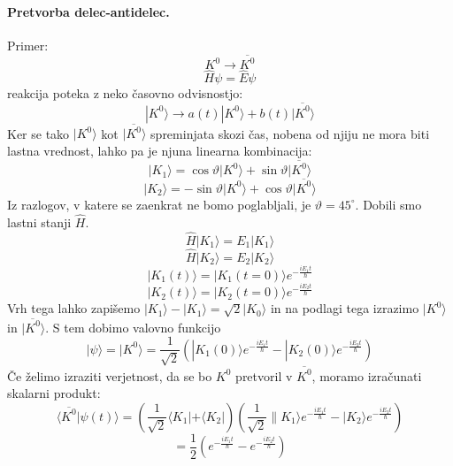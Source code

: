 \documentclass[a4paper]{article}
\newcommand{\avg}[1]{\langle {#1} \rangle}
\newcommand{\anti}[1]{\overline{#1}}
\begin{document}
\paragraph{Pretvorba delec-antidelec.} Primer: $$K^0 \to \anti{K^0}$$
$$\widehat{H}\psi = \widehat{E}\psi$$
reakcija poteka z neko časovno odvisnostjo: $$|K^0\rangle \to a(t) |K^0\rangle + b(t)|\anti{K^0}\rangle$$
Ker se tako $|K^0\rangle$ kot $|\anti{K^0}\rangle$ spreminjata skozi čas, nobena od njiju ne mora biti lastna vrednost, lahko pa je njuna linearna kombinacija:
$$|K_1\rangle = \cos\vartheta |K^0\rangle + \sin\vartheta |\anti{K^0}\rangle$$
$$|K_2\rangle = -\sin\vartheta |K^0\rangle + \cos\vartheta |\anti{K^0}\rangle$$
Iz razlogov, v katere se zaenkrat ne bomo poglabljali, je $\vartheta = 45^\circ$. Dobili smo lastni stanji $\widehat{H}$.
$$\widehat{H} |K_1\rangle = E_1 |K_1\rangle$$
$$\widehat{H} |K_2\rangle = E_2 |K_2\rangle$$
$$|K_1(t)\rangle = |K_1(t=0)\rangle e^{-\frac{iE_1t}{\hbar}}$$
$$|K_2(t)\rangle = |K_2(t=0)\rangle e^{-\frac{iE_2t}{\hbar}}$$
Vrh tega lahko zapišemo $|K_1\rangle - |K_1\rangle = \sqrt{2}|K_0\rangle$ in na podlagi tega izrazimo $|K^0\rangle$ in $|\anti{K^0}\rangle$. S tem dobimo valovno funkcijo
$$|\psi\rangle = |K^0\rangle = \frac{1}{\sqrt{2}} \left(|K_1(0)\rangle e^{-\frac{iE_1t}{\hbar}} - |K_2(0)\rangle e^{-\frac{iE_2t}{\hbar}}\right)$$
Če želimo izraziti verjetnost, da se bo $K^0$ pretvoril v $\anti{K^0}$, moramo izračunati skalarni produkt:
$$\avg{\anti{K^0}|\psi(t)} = \left(\frac{1}{\sqrt{2}}\langle K_1|+ \langle K_2|\right)\left(\frac{1}{\sqrt{2}}\|K_1\rangle e^{-\frac{iE_1t}{\hbar}} - |K_2\rangle e^{-\frac{iE_2t}{\hbar}}\right)$$
$$= \frac{1}{2}\left(e^{-\frac{iE_1 t}{\hbar}} - e^{-\frac{iE_2t}{\hbar}}\right)$$
\end{document}
